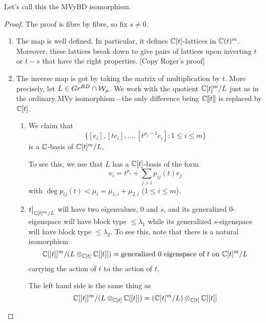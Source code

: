 \documentclass[draft]{article}
\begin{document}
Let's call this the MVyBD isomorphism.

\begin{proof}
    The proof is fibre by fibre, so fix $s\ne 0$. 
    \begin{enumerate}
        \item The map is well defined. In particular, it defines $\mathbb C[t]$-lattices in $\mathbb C(t)^m$. Moreover, these lattices break down to give pairs of lattices upon inverting $t$ or $t-s$ that have the right properties. [Copy Roger's proof]
        \item The inverse map is got by taking the matrix of multiplication by $t$.  More precisely, let $ L \in Gr^{BD} \cap \mathcal W_\mu$.  We work with the quotient $\mathbb C[t]^m/L$ just as in the ordinary MVy isomorphism---the only difference being $\mathbb C[\hspace{-.12em}[ {t} ]\hspace{-.12em}]$ is replaced by $\mathbb C[t]$.
\begin{enumerate}
    \item 
    We claim that 
    \begin{equation}
        \{[e_i],[te_i],\dots,[t^{\mu_{i}-1}e_i] : 1\le i \le m\}
    \end{equation}
    is a $\mathbb C$-basis of $\mathbb C[t]^m/L$.
    
    To see this, we use that $ L $ 
 has a $\mathbb C[t]$-basis of the form 
    \begin{equation}
        v_i = t^{\mu_i} + \sum_{j>i} p_{ij}(t) e_j 
    \end{equation}
    with $\deg p_{ij}(t) < \mu_i = \mu_{1,i} + \mu_{2,i}$ ($1\le i\le m$).
    \item $t\big|_{\mathbb C[t]^m/L}$ will have two eigenvalues, 0 and $s$, and its generalized 0-eigenspace will have block type $\le \lambda_1$ while its generalized $s$-eigenspace will have block type $\le \lambda_2$. 
    To see this, note that there is a natural isomorphism
    $$\mathbb C[[t]]^m/(L \otimes_{\mathbb C[t]} \mathbb C[[t]]) = \text{generalized $0$ eigenspace of $t$ on } \mathbb C[t]^m/L$$
    carrying the action of $t $ to the action of $t$.
    
    The left hand side is the same thing as
    $$ \mathbb C[[t]]^m / (L \otimes_{\mathbb C[t]} \mathbb C[[t]]) = (\mathbb C[t]^m/L) \otimes_{\mathbb C[t]} \mathbb C[[t]] $$
    

\end{enumerate}
\end{enumerate}
\end{proof}
\end{document}

